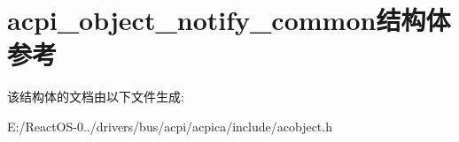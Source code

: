 \hypertarget{structacpi__object__notify__common}{}\section{acpi\+\_\+object\+\_\+notify\+\_\+common结构体 参考}
\label{structacpi__object__notify__common}


该结构体的文档由以下文件生成\+:\begin{DoxyCompactItemize}
\item 
E\+:/\+React\+O\+S-\/0../drivers/bus/acpi/acpica/include/acobject.\+h\end{DoxyCompactItemize}
